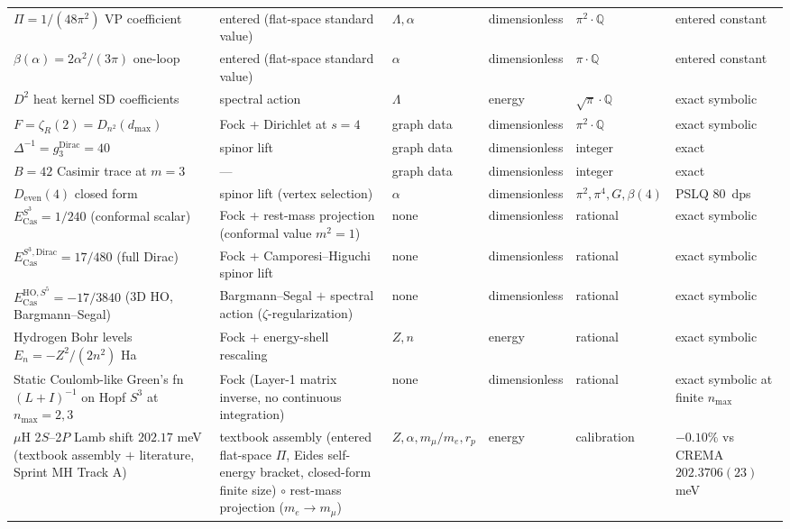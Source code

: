 \documentclass[11pt]{article}
\begin{document}
\begin{longtable}{p{3.5cm} p{2.8cm} p{1.3cm} p{2.2cm} p{1.8cm} p{1.4cm}}
$\Pi = 1/(48\pi^2)$ VP coefficient & entered (flat-space standard value) &
$\Lambda, \alpha$ & dimensionless & $\pi^2{\cdot}\mathbb{Q}$ &
entered constant \\
$\beta(\alpha) = 2\alpha^2/(3\pi)$ one-loop & entered (flat-space standard value) &
$\alpha$ & dimensionless & $\pi{\cdot}\mathbb{Q}$ & entered constant \\
$D^2$ heat kernel SD coefficients & spectral action & $\Lambda$ &
energy & $\sqrt{\pi}{\cdot}\mathbb{Q}$ & exact symbolic \\
$F = \zeta_R(2) = D_{n^2}(d_\text{max})$ & Fock + Dirichlet at
$s=4$ & graph data & dimensionless & $\pi^2{\cdot}\mathbb{Q}$ &
exact symbolic \\
$\Delta^{-1} = g_3^\text{Dirac} = 40$ & spinor lift & graph data &
dimensionless & integer & exact \\
$B = 42$ Casimir trace at $m=3$ & --- & graph data &
dimensionless & integer & exact \\
$D_\text{even}(4)$ closed form & spinor lift (vertex selection) &
$\alpha$ & dimensionless & $\pi^2, \pi^4, G, \beta(4)$ & PSLQ 80~dps \\
$E_\text{Cas}^{S^3} = 1/240$ (conformal scalar) & Fock + rest-mass
projection (conformal value $m^2 = 1$) & none & dimensionless &
rational & exact symbolic \\
$E_\text{Cas}^{S^3, \text{Dirac}} = 17/480$ (full Dirac) & Fock +
Camporesi--Higuchi spinor lift & none & dimensionless & rational &
exact symbolic \\
$E_\text{Cas}^{\text{HO}, S^5} = -17/3840$ (3D HO, Bargmann--Segal) &
Bargmann--Segal $+$ spectral action ($\zeta$-regularization) & none &
dimensionless & rational & exact symbolic \\
Hydrogen Bohr levels $E_n = -Z^2/(2n^2)$ Ha & Fock $+$ energy-shell
rescaling & $Z, n$ & energy & rational & exact symbolic \\
Static Coulomb-like Green's fn $(L+I)^{-1}$ on Hopf $S^3$ at
$n_\text{max} = 2, 3$ & Fock (Layer-1 matrix inverse, no continuous
integration) & none & dimensionless & rational & exact symbolic at
finite $n_\text{max}$ \\
$\mu$H 2$S$--2$P$ Lamb shift $202.17$ meV (textbook assembly $+$ literature,
Sprint MH Track A) & textbook assembly (entered flat-space $\Pi$, Eides
self-energy bracket, closed-form finite size) $\circ$ rest-mass projection ($m_e \to m_\mu$)
& $Z, \alpha, m_\mu/m_e, r_p$ & energy & calibration &
$-0.10\%$ vs CREMA $202.3706(23)$ meV \\

\end{longtable}
\end{document}
